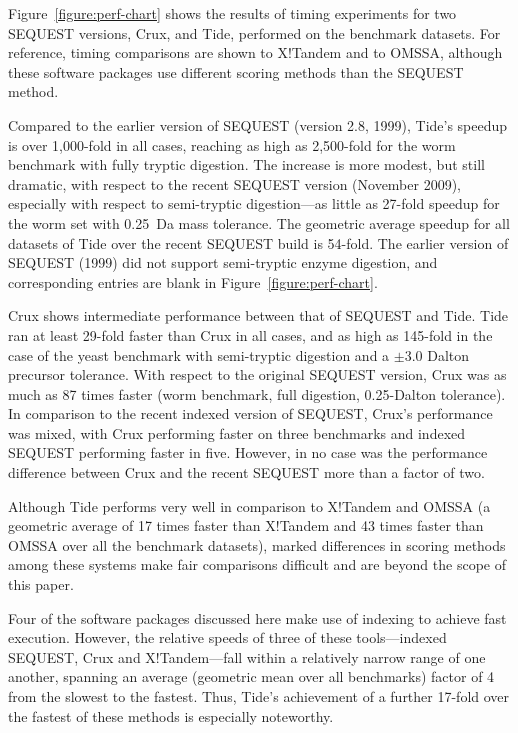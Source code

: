 Figure~\ref{figure:perf-chart} shows the results of timing experiments
for two SEQUEST versions, Crux, and Tide, performed on the benchmark
datasets.  For reference, timing comparisons are shown to X!Tandem and
to OMSSA, although these software packages use different scoring
methods than the SEQUEST method.

Compared to the earlier version of SEQUEST (version 2.8, 1999), Tide's
speedup is over 1,000-fold in all cases, reaching as high as
2,500-fold for the worm benchmark with fully tryptic digestion. The
increase is more modest, but still dramatic, with respect to the
recent SEQUEST version (November 2009), especially with respect to
semi-tryptic digestion---as little as 27-fold speedup for the worm set with
0.25~Da mass tolerance. The geometric average speedup for all
datasets of Tide over the recent SEQUEST build is 54-fold. The earlier
version of SEQUEST (1999) did not support semi-tryptic enzyme digestion,
and corresponding entries are blank in Figure~\ref{figure:perf-chart}.

Crux shows intermediate performance between that of SEQUEST and
Tide. Tide ran at least 29-fold faster than Crux in all cases, and as
high as 145-fold in the case of the yeast benchmark with semi-tryptic
digestion and a $\pm 3.0$ Dalton precursor tolerance. With respect to
the original SEQUEST version, Crux was as much as 87 times faster
(worm benchmark, full digestion, 0.25-Dalton tolerance). In comparison
to the recent indexed version of SEQUEST, Crux's performance was
mixed, with Crux performing faster on three benchmarks and indexed
SEQUEST performing faster in five. However, in no case was the
performance difference between Crux and the recent SEQUEST more than a
factor of two.

Although Tide performs very well in comparison to X!Tandem and OMSSA
(a geometric average of 17 times faster than X!Tandem and 43 times
faster than OMSSA over all the benchmark datasets), marked differences
in scoring methods among these systems make fair comparisons difficult
and are beyond the scope of this paper.

Four of the software packages discussed here make use of indexing to
achieve fast execution.  However, the relative speeds of three of
these tools---indexed SEQUEST, Crux and X!Tandem---fall within a
relatively narrow range of one another, spanning an average (geometric
mean over all benchmarks) factor of 4 from the slowest to the
fastest. Thus, Tide's achievement of a further 17-fold over the
fastest of these methods is especially noteworthy.

